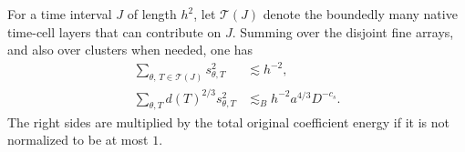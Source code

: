 \begin{lemma}\label{lem:dyadic-flattening}
For a time interval $J$ of length $h^2$, let $\mathcal T(J)$ denote the
boundedly many native time-cell layers that can contribute on $J$.
Summing over the disjoint fine arrays, and also over clusters when
needed, one has
\begin{equation}\label{eq:src13}
 \begin{aligned}
 \sum_{\theta,\,T\in\mathcal T(J)}s_{\theta,T}^2
     &\lesssim h^{-2},\\
 \sum_{\theta,T}d(T)^{2/3}s_{\theta,T}^2
     &\lesssim_B h^{-2}a^{4/3}D^{-c_s}.
 \end{aligned}
\end{equation}
The right sides are multiplied by the total original coefficient
energy if it is not normalized to be at most $1$.
\end{lemma}
